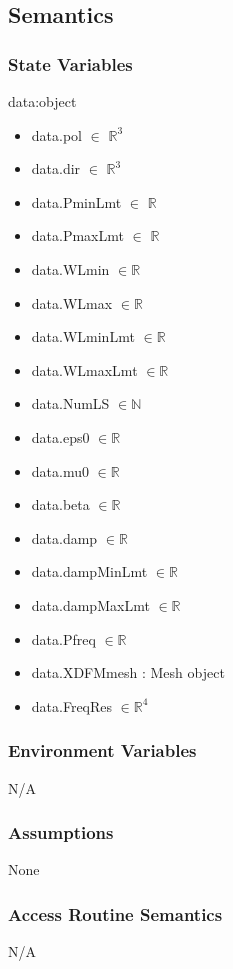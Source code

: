 \documentclass[12pt, titlepage]{article}
\begin{document}
\subsection{Semantics}

\subsubsection{State Variables}

data:object 
\begin{itemize}
	\item data.pol $\in$ $\mathbb{R}^3$
	\item data.dir $\in$ $\mathbb{R}^3$
	\item data.PminLmt $\in$ $\mathbb{R}$
	\item data.PmaxLmt $\in$ $\mathbb{R}$
	\item data.WLmin $\in \mathbb{R}$
	\item data.WLmax $\in \mathbb{R}$
	\item data.WLminLmt $\in \mathbb{R}$
	\item data.WLmaxLmt $\in \mathbb{R}$
	\item data.NumLS $\in \mathbb{N}$
	\item data.eps0 $\in \mathbb{R}$
	\item data.mu0  $\in \mathbb{R}$
	\item data.beta $\in \mathbb{R}$
	\item data.damp $\in \mathbb{R}$
	\item data.dampMinLmt $\in \mathbb{R}$
	\item data.dampMaxLmt $\in \mathbb{R}$
	\item data.Pfreq $\in \mathbb{R}$
	\item data.XDFMmesh : Mesh object 
	\item data.FreqRes $\in \mathbb{R}^4$ 
	
	
\end{itemize}

\subsubsection{Environment Variables}

N/A
\subsubsection{Assumptions}

None

\subsubsection{Access Routine Semantics}
N/A
\end{document}
